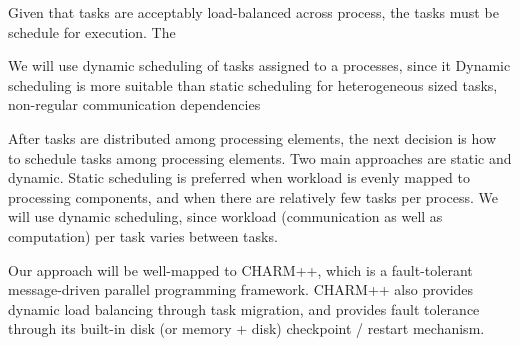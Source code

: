 \documentclass[14pt,letter]{article}
\begin{document}


Given that tasks are acceptably load-balanced across process, the
tasks must be schedule for execution.  The 


We will use dynamic scheduling of tasks assigned to a processes,
since it 
Dynamic scheduling is more suitable than static scheduling for
heterogeneous sized tasks, non-regular communication dependencies


After tasks are distributed among processing elements, the next decision is
how to schedule tasks among processing elements.  Two main approaches are
static and dynamic.  Static scheduling is preferred when workload is evenly mapped to processing components, and when there are relatively few tasks per process.  We
will use dynamic scheduling, since workload (communication as well as computation)
per task varies between tasks.  

Our approach will be well-mapped to CHARM++, which is a fault-tolerant
message-driven parallel programming framework.  CHARM++ also provides
dynamic load balancing through task migration, and provides fault
tolerance through its built-in disk (or memory + disk) checkpoint /
restart mechanism.
\end{document}
